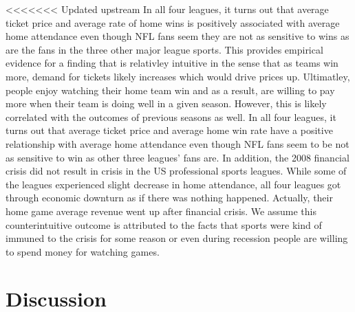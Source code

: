 \documentclass[man, fleqn, noextraspace,floatsintext]{apa6}
\begin{document}
\textless{}\textless{}\textless{}\textless{}\textless{}\textless{}\textless{} Updated upstream
In all four leagues, it turns out that average ticket price and average rate of home wins is positively associated with average home attendance even though NFL fans seem they are not as sensitive to wins as are the fans in the three other major league sports. This provides empirical evidence for a finding that is relativley intuitive in the sense that as teams win more, demand for tickets likely increases which would drive prices up. Ultimatley, people enjoy watching their home team win and as a result, are willing to pay more when their team is doing well in a given season. However, this is likely correlated with the outcomes of previous seasons as well.
In all four leagues, it turns out that average ticket price and average home win rate have a positive relationship with average home attendance even though NFL fans seem to be not as sensitive to win as other three leagues' fans are. In addition, the 2008 financial crisis did not result in crisis in the US professional sports leagues. While some of the leagues experienced slight decrease in home attendance, all four leagues got through economic downturn as if there was nothing happened. Actually, their home game average revenue went up after financial crisis. We assume this counterintuitive outcome is attributed to the facts that sports were kind of immuned to the crisis for some reason or even during recession people are willing to spend money for watching games.

\hypertarget{discussion}{%
\section{Discussion}\label{discussion}}
\end{document}
